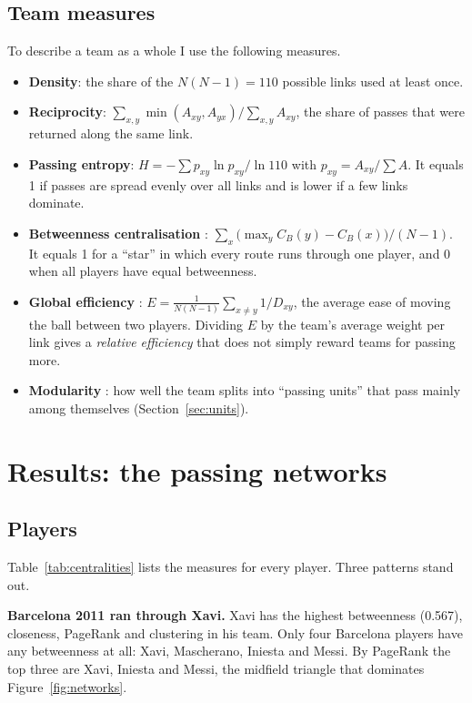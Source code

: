 \documentclass[11pt,a4paper]{article}
\begin{document}
\subsection{Team measures}\label{sec:teamdefs}

To describe a team as a whole I use the following measures.
\begin{itemize}
\item \textbf{Density}: the share of the $N(N-1) = 110$ possible links used at least once.
\item \textbf{Reciprocity}: $\sum_{x,y}\min(A_{xy},A_{yx}) / \sum_{x,y} A_{xy}$, the share of passes that were returned along the same link.
\item \textbf{Passing entropy}: $H = -\sum p_{xy}\ln p_{xy} / \ln 110$ with $p_{xy} = A_{xy}/\sum A$. It equals 1 if passes are spread evenly over all links and is lower if a few links dominate.
\item \textbf{Betweenness centralisation} \cite{freeman}: $\sum_x \big(\max_y C_B(y) - C_B(x)\big)/(N-1)$. It equals 1 for a ``star'' in which every route runs through one player, and 0 when all players have equal betweenness.
\item \textbf{Global efficiency} \cite{latora}: $E = \frac{1}{N(N-1)}\sum_{x\ne y} 1/D_{xy}$, the average ease of moving the ball between two players. Dividing $E$ by the team's average weight per link gives a \emph{relative efficiency} that does not simply reward teams for passing more.
\item \textbf{Modularity} \cite{newman}: how well the team splits into ``passing units'' that pass mainly among themselves (Section~\ref{sec:units}).
\end{itemize}

\section{Results: the passing networks}\label{sec:results}

\subsection{Players}

Table~\ref{tab:centralities} lists the measures for every player. Three patterns stand out.

\textbf{Barcelona 2011 ran through Xavi.} Xavi has the highest betweenness (0.567), closeness, PageRank and clustering in his team. Only four Barcelona players have any betweenness at all: Xavi, Mascherano, Iniesta and Messi. By PageRank the top three are Xavi, Iniesta and Messi, the midfield triangle that dominates Figure~\ref{fig:networks}.
\end{document}
